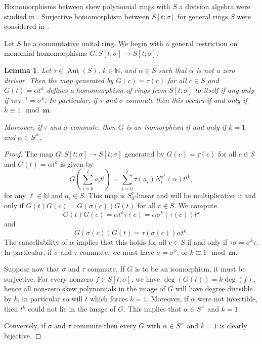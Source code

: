 \documentclass[11pt]{amsart}
\theoremstyle{plain}
\newtheorem{lemma}[theorem]{Lemma}
\theoremstyle{definition}
\numberwithin{equation}{section}
\numberwithin{figure}{section}
\newcommand{\ring}{S}
\newcommand{\Stsigma}{S[t;\sigma]}
\newcommand{\os}{\mathbf{m}}  %
\newcommand{\N}{\mathbb{N}}
\DeclareMathOperator{\Aut}{Aut}
\begin{document}
Homomorphisms between skew polynomial rings with $\ring$ a division algebra were studied in \cite{LamLeroy1992}. Surjective homomorphism between $\Stsigma$ for general rings $\ring$ were considered in \cite{Rimmer1978}.

Let $\ring$ be a commutative unital ring.
We begin with a general restriction on monomial homomorphisms $G:\Stsigma\to\Stsigma$.

\begin{lemma}\label{L:Ktsigmatoitself}
    Let $\tau\in \Aut(\ring)$, $k\in \N$,  and $\alpha\in \ring$ such that $\alpha$ is not a zero divisor.  Then the map generated by $G(c)=\tau(c)$ for all $c\in \ring$ and $G(t)=\alpha t^k$ defines a homomorphism of rings from $\Stsigma$ to itself if any only if $\tau\sigma\tau^{-1}=\sigma^k$.  In particular, if $\tau$ and $\sigma$ commute then this occurs if and only if $k\equiv 1 \mod \os$.

    Moreover, if $\tau$ and $\sigma$ commute, then $G$ is an isomorphism if and only if $k=1$ and $\alpha\in \ring^\times$.
\end{lemma}

\begin{proof}
The map $G:\Stsigma \to \Stsigma$ generated by $G(c)=\tau(c)$ for all $c\in \ring$ and $G(t)=\alpha t^k$ is given by
$$
G(\sum_{i=0}^{\ell} a_i t^i) = \sum_{i=0}^\ell \tau(a_i) N_i^{\sigma^k}(\alpha) t^{ik},
$$
for any $\ell\in \mathbb{N}$ and $a_i\in \ring$.
This map is $\ring_0^\tau$-linear and will be multiplicative if and only if  $G(t)G(c)=G(\sigma(c))G(t)$ for all $c\in \ring$.
 We compute
$$
G(t)G(c)=\alpha t^k \tau(c) = \alpha \sigma^k(\tau(c)) t^k
$$
and
$$
G(\sigma(c))G(t)=\tau(\sigma(c))\alpha t^k.
$$
The cancellability of $\alpha$ implies that this holds for all $c\in \ring$ if and only if $\tau\sigma=\sigma^k\tau$.  In particular, if $\sigma$ and $\tau$ commute, we must have $\sigma=\sigma^k$, or  $k\equiv 1 \mod \os$.

Suppose now that $\sigma$ and $\tau$ commute. If $G$ is to be an isomorphism, it must be surjective. For every nonzero $f\in  \Stsigma$, we have $\deg (G(t))=k\deg(f)$, hence all non-zero skew polynomials in the image of $G$ will have degree divisible by $k$, in particular so will $t$ which forces $k=1$.
 Moreover, if $\alpha$ were not invertible, then $t^k$ could not lie in the image of $G$. This implies that $\alpha\in S^\times$ and $k=1$.

Conversely,  if $\sigma$ and $\tau$ commute then every $G$ with $\alpha\in S^\times$ and $k=1$ is clearly bijective.
\end{proof}
\end{document}
